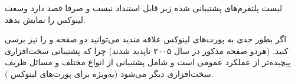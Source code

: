 
\begin{note}
لیست پلتفرم‌های پشتیبانی شده زیر قابل استنداد نیست و صرفا قصد دارد وسعت لینوکس را نمایش بدهد.
\end{note}


اگر بطور جدی به پورت‌های لینوکس علاقه مندید می‌توانید دو صفحه
و
را نیز برسی کنید.  (هردو صفحه مذکور در سال ۲۰۰۵ ناپدید شدند)
چرا که پشتیبانی سخت‌افزاری پیچیده‌تر از عملکرد عمومی  است و شامل پشتیبانی از
انواع مختلف  و مسائل ظریف سخت‌افزاری دیگر می‌شود (به‌ویژه برای پورت‌های لینوکس
).





